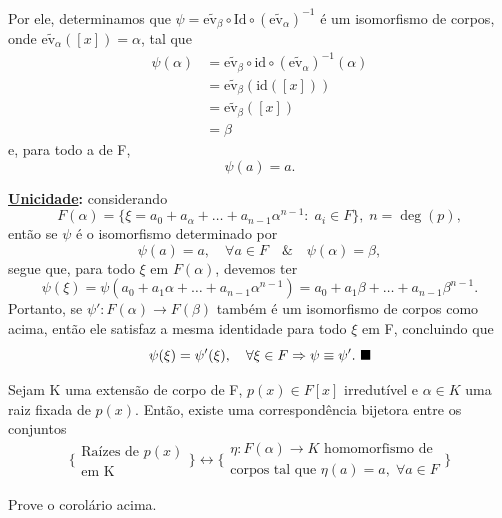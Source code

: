\documentclass[../algebraIII_notes.tex]{subfiles}
\begin{document}
\begin{proof*}
\begin{center}
\begin{tikzpicture}
		\end{tikzpicture}
	\end{center}
	Por ele, determinamos que \(\psi = \widetilde{\mathrm{ev}_{\beta }}\circ \mathrm{Id}\circ (\widetilde{\mathrm{ev}_{\alpha }})^{-1}\) é um isomorfismo de corpos, onde \(\widetilde{\mathrm{ev}_{\alpha }}([x])=\alpha \), tal que
	\begin{align*}
		\psi (\alpha ) & = \widetilde{\mathrm{ev}_{\beta }} \circ \mathrm{id}\circ (\widetilde{\mathrm{ev}_{\alpha }})^{-1}(\alpha ) \\
		               & = \widetilde{\mathrm{ev}_{\beta }}(\mathrm{id}([x]))                                                        \\
		               & = \widetilde{\mathrm{ev}_{\beta }}([x])                                                                     \\
		               & =\beta
	\end{align*}
	e, para todo a de F,
	\[
		\psi (a)=a.
	\]

	\textbf{\underline{Unicidade}:} considerando
	\[
		F(\alpha )=\{\xi = a_{0}+a_{\alpha } +\dotsc + a_{n-1}\alpha^{n-1}:\; a_{i}\in F\}, \; n = \deg{(p)},
	\]
	então se \(\psi \) é o isomorfismo determinado por
	\[
		\psi (a)=a, \quad \forall a \in F \quad\&\quad \psi (\alpha )=\beta ,
	\]
	segue que, para todo \(\xi \) em \(F(\alpha )\), devemos ter
	\[
		\psi (\xi )=\psi (a_{0}+a_{1}\alpha +\dotsc + a_{n-1}\alpha^{n-1}) = a_{0}+a_{1}\beta +\dotsc + a_{n-1}\beta^{n-1}.
	\]
	Portanto, se \(\psi' :F(\alpha )\rightarrow F(\beta )\) também é um isomorfismo de corpos como acima, então ele satisfaz a mesma identidade para todo \(\xi \) em F, concluindo que
	\[
		\psi (\xi )=\psi '(\xi ),\quad \forall \xi \in F \Rightarrow \psi \equiv \psi '. \text{ $\blacksquare$}
	\]
\end{proof*}
\begin{crl*}
	Sejam K uma extensão de corpo de F, \(p(x)\in F[x]\) irredutível e \(\alpha \in K\) uma raiz fixada de \(p(x)\). Então, existe uma correspondência bijetora entre os conjuntos
	\[
		\biggl\{\substack{\text{Raízes de }p(x) \\ \text{em K}}\biggr\}
		\longleftrightarrow \biggl\{\substack{\eta :F(\alpha )\rightarrow K \text{ homomorfismo de} \\ \text{corpos tal que }\eta (a)=a,\; \forall a\in F }\biggr\}
	\]
\end{crl*}
\begin{exr}
	Prove o corolário acima.
\end{exr}
\end{document}
